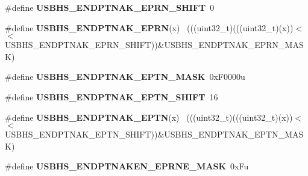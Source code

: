 \begin{DoxyCompactItemize}
\item 
\hypertarget{group___u_s_b_h_s___register___masks_gae543d029cf5333852d11ec0d17d2a627}{}\#define {\bfseries U\+S\+B\+H\+S\+\_\+\+E\+N\+D\+P\+T\+N\+A\+K\+\_\+\+E\+P\+R\+N\+\_\+\+S\+H\+I\+F\+T}~0\label{group___u_s_b_h_s___register___masks_gae543d029cf5333852d11ec0d17d2a627}

\item 
\hypertarget{group___u_s_b_h_s___register___masks_ga0ee8973d88207aa7f137910d8d839020}{}\#define {\bfseries U\+S\+B\+H\+S\+\_\+\+E\+N\+D\+P\+T\+N\+A\+K\+\_\+\+E\+P\+R\+N}(x)                                  ~(((uint32\+\_\+t)(((uint32\+\_\+t)(x))$<$$<$U\+S\+B\+H\+S\+\_\+\+E\+N\+D\+P\+T\+N\+A\+K\+\_\+\+E\+P\+R\+N\+\_\+\+S\+H\+I\+F\+T))\&U\+S\+B\+H\+S\+\_\+\+E\+N\+D\+P\+T\+N\+A\+K\+\_\+\+E\+P\+R\+N\+\_\+\+M\+A\+S\+K)\label{group___u_s_b_h_s___register___masks_ga0ee8973d88207aa7f137910d8d839020}

\item 
\hypertarget{group___u_s_b_h_s___register___masks_gab51902806cc1626fd2c03dfd53d61805}{}\#define {\bfseries U\+S\+B\+H\+S\+\_\+\+E\+N\+D\+P\+T\+N\+A\+K\+\_\+\+E\+P\+T\+N\+\_\+\+M\+A\+S\+K}~0x\+F0000u\label{group___u_s_b_h_s___register___masks_gab51902806cc1626fd2c03dfd53d61805}

\item 
\hypertarget{group___u_s_b_h_s___register___masks_ga743feff4f4d1636d34f50ccde7b1fab4}{}\#define {\bfseries U\+S\+B\+H\+S\+\_\+\+E\+N\+D\+P\+T\+N\+A\+K\+\_\+\+E\+P\+T\+N\+\_\+\+S\+H\+I\+F\+T}~16\label{group___u_s_b_h_s___register___masks_ga743feff4f4d1636d34f50ccde7b1fab4}

\item 
\hypertarget{group___u_s_b_h_s___register___masks_gab592885ecac02b81985ee180a571c35c}{}\#define {\bfseries U\+S\+B\+H\+S\+\_\+\+E\+N\+D\+P\+T\+N\+A\+K\+\_\+\+E\+P\+T\+N}(x)                                  ~(((uint32\+\_\+t)(((uint32\+\_\+t)(x))$<$$<$U\+S\+B\+H\+S\+\_\+\+E\+N\+D\+P\+T\+N\+A\+K\+\_\+\+E\+P\+T\+N\+\_\+\+S\+H\+I\+F\+T))\&U\+S\+B\+H\+S\+\_\+\+E\+N\+D\+P\+T\+N\+A\+K\+\_\+\+E\+P\+T\+N\+\_\+\+M\+A\+S\+K)\label{group___u_s_b_h_s___register___masks_gab592885ecac02b81985ee180a571c35c}

\item 
\hypertarget{group___u_s_b_h_s___register___masks_gad2c767d084ab731d55678f179931248f}{}\#define {\bfseries U\+S\+B\+H\+S\+\_\+\+E\+N\+D\+P\+T\+N\+A\+K\+E\+N\+\_\+\+E\+P\+R\+N\+E\+\_\+\+M\+A\+S\+K}~0x\+Fu\label{group___u_s_b_h_s___register___masks_gad2c767d084ab731d55678f179931248f}


\end{DoxyCompactItemize}
